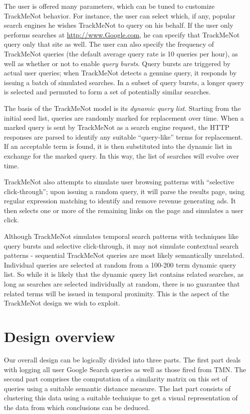 \documentclass[11pt]{article}
\begin{document}
\begin{multicols}{2}
The user is offered many parameters, which can be tuned to customize
TrackMeNot behavior. For instance, the user can select which, if any,
popular search engines he wishes TrackMeNot to query on his behalf. If
the user only performs searches at \url{http://www.Google.com}, he can
specify that TrackMeNot query only  that site as well. The user can
also specify the frequency of TrackMeNot queries (the default average
query rate is 10 queries per hour), as well as whether or not to enable {\it query
bursts}. Query bursts are triggered by actual user queries; when
TrackMeNot detects a genuine query, it responds by issuing a batch of
simulated searches. In a subset of query bursts, a longer query is
selected and permuted to form a set of potentially similar searches.

The basis of the TrackMeNot model is its {\it dynamic query
  list}. Starting from the initial seed list, queries are randomly
marked for replacement over time. When a marked query is sent by TrackMeNot as a
search engine request, the HTTP responses are parsed to identify any
suitable ``query-like'' terms for replacement. If an acceptable term
is found, it is then substituted into the dynamic list in exchange for
the marked query. In this way, the list of searches will evolve over
time.

TrackMeNot also attempts to simulate user browsing patterns with
``selective click-through''; upon issuing a random query,
it will parse the results page, using regular expression matching to
identify and remove revenue generating ads. It then selects one or
more of the remaining links on the page and simulates a user click.

Although TrackMeNot simulates temporal search patterns with techniques
like query bursts and selective click-through, it may not simulate
contextual search patterns - sequential TrackMeNot queries are most
likely semantically unrelated. Individual queries are selected at
random from a 100-200 term dynamic query list. So while it is likely
that the dynamic query list contains related searches, as long as
searches are selected individually at random, there is no guarantee
that related terms will be issued in temporal proximity. This is the
aspect of the TrackMeNot design we wish to exploit.

\section{Design overview}
\label{sec:design}
Our overall design can be logically divided into three parts. The
first part deals with logging all user Google Search queries as well
as those fired from TMN. The second part comprises the computation of
a similarity matrix on this set of queries using a suitable semantic
distance measure. The last part consists of clustering this data using
a suitable technique to get a visual representation of the data from
which conclusions can be deduced.


\end{multicols}
\end{document}
